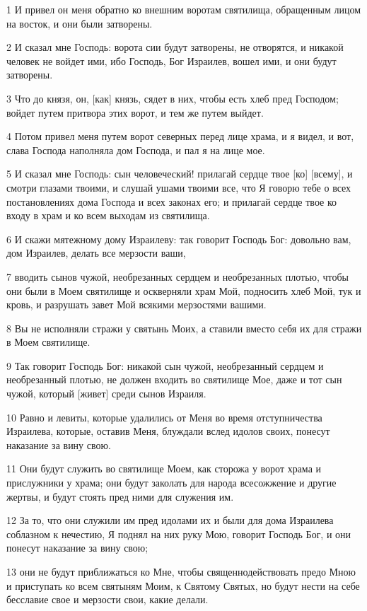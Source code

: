 \par 1 И привел он меня обратно ко внешним воротам святилища, обращенным лицом на восток, и они были затворены.
\par 2 И сказал мне Господь: ворота сии будут затворены, не отворятся, и никакой человек не войдет ими, ибо Господь, Бог Израилев, вошел ими, и они будут затворены.
\par 3 Что до князя, он, [как] князь, сядет в них, чтобы есть хлеб пред Господом; войдет путем притвора этих ворот, и тем же путем выйдет.
\par 4 Потом привел меня путем ворот северных перед лице храма, и я видел, и вот, слава Господа наполняла дом Господа, и пал я на лице мое.
\par 5 И сказал мне Господь: сын человеческий! прилагай сердце твое [ко] [всему], и смотри глазами твоими, и слушай ушами твоими все, что Я говорю тебе о всех постановлениях дома Господа и всех законах его; и прилагай сердце твое ко входу в храм и ко всем выходам из святилища.
\par 6 И скажи мятежному дому Израилеву: так говорит Господь Бог: довольно вам, дом Израилев, делать все мерзости ваши,
\par 7 вводить сынов чужой, необрезанных сердцем и необрезанных плотью, чтобы они были в Моем святилище и оскверняли храм Мой, подносить хлеб Мой, тук и кровь, и разрушать завет Мой всякими мерзостями вашими.
\par 8 Вы не исполняли стражи у святынь Моих, а ставили вместо себя их для стражи в Моем святилище.
\par 9 Так говорит Господь Бог: никакой сын чужой, необрезанный сердцем и необрезанный плотью, не должен входить во святилище Мое, даже и тот сын чужой, который [живет] среди сынов Израиля.
\par 10 Равно и левиты, которые удалились от Меня во время отступничества Израилева, которые, оставив Меня, блуждали вслед идолов своих, понесут наказание за вину свою.
\par 11 Они будут служить во святилище Моем, как сторожа у ворот храма и прислужники у храма; они будут заколать для народа всесожжение и другие жертвы, и будут стоять пред ними для служения им.
\par 12 За то, что они служили им пред идолами их и были для дома Израилева соблазном к нечестию, Я поднял на них руку Мою, говорит Господь Бог, и они понесут наказание за вину свою;
\par 13 они не будут приближаться ко Мне, чтобы священнодействовать предо Мною и приступать ко всем святыням Моим, к Святому Святых, но будут нести на себе бесславие свое и мерзости свои, какие делали.
